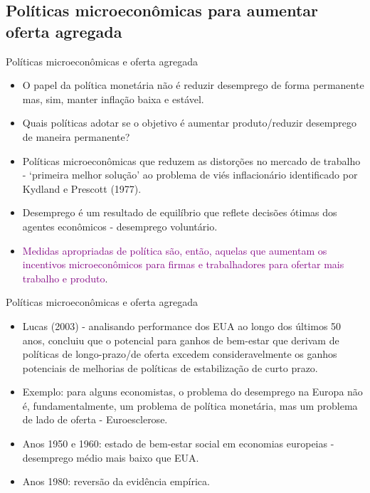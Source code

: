 \documentclass[10pt]{beamer}
\begin{document}
\subsection{Políticas microeconômicas para aumentar oferta agregada}
\begin{frame}{Políticas microeconômicas e oferta agregada}
    \begin{itemize}
        \item O papel da política monetária não é reduzir desemprego de forma permanente mas, sim, manter inflação baixa e estável.
        \bigskip
        \item Quais políticas adotar se o objetivo é aumentar produto/reduzir desemprego de maneira permanente?
        \bigskip
        \item Políticas microeconômicas que reduzem as distorções no mercado de trabalho - `primeira melhor solução' ao problema de viés inflacionário identificado por Kydland e Prescott (1977).
        \bigskip
        \item Desemprego é um resultado de equilíbrio que reflete decisões ótimas dos agentes econômicos - desemprego voluntário.
        \bigskip
        \item \textcolor{purple}{Medidas apropriadas de política são, então, aquelas que aumentam os incentivos microeconômicos para firmas e trabalhadores para ofertar mais trabalho e produto}.
    \end{itemize}
\end{frame}

\begin{frame}{Políticas microeconômicas e oferta agregada}
    \begin{itemize}
        \item Lucas (2003) - analisando performance dos EUA ao longo dos últimos 50 anos, concluiu que o potencial para ganhos de bem-estar que derivam de políticas de longo-prazo/de oferta excedem consideravelmente os ganhos potenciais de melhorias de políticas de estabilização de curto prazo.
        \bigskip
        \item Exemplo: para alguns economistas, o problema do desemprego na Europa não é, fundamentalmente, um problema de política monetária, mas um problema de lado de oferta - Euroesclerose.
        \bigskip
        \item Anos 1950 e 1960: estado de bem-estar social em economias europeias - desemprego médio mais baixo que EUA.
        \bigskip
        \item Anos 1980: reversão da evidência empírica.
    \end{itemize}
\end{frame}
\end{document}
